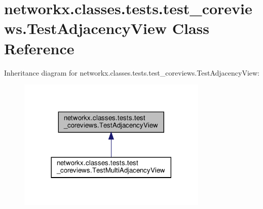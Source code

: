 \hypertarget{classnetworkx_1_1classes_1_1tests_1_1test__coreviews_1_1TestAdjacencyView}{}\section{networkx.\+classes.\+tests.\+test\+\_\+coreviews.\+Test\+Adjacency\+View Class Reference}
\label{classnetworkx_1_1classes_1_1tests_1_1test__coreviews_1_1TestAdjacencyView}


Inheritance diagram for networkx.\+classes.\+tests.\+test\+\_\+coreviews.\+Test\+Adjacency\+View\+:
\nopagebreak
\begin{figure}[H]
\begin{center}
\leavevmode
\includegraphics[width=257pt]{classnetworkx_1_1classes_1_1tests_1_1test__coreviews_1_1TestAdjacencyView__inherit__graph}
\end{center}
\end{figure}
